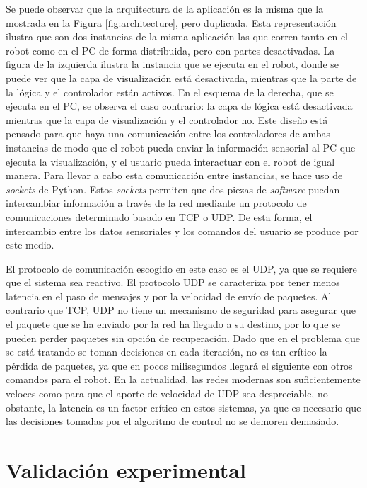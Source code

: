 Se puede observar que la arquitectura de la aplicación es la misma que la mostrada en la Figura \ref{fig:architecture}, pero duplicada. Esta representación ilustra que son dos instancias de la misma aplicación las que corren tanto en el robot como en el PC de forma distribuida, pero con partes desactivadas. La figura de la izquierda ilustra la instancia que se ejecuta en el robot, donde se puede ver que la capa de visualización está desactivada, mientras que la parte de la lógica y el controlador están activos. En el esquema de la derecha, que se ejecuta en el PC, se observa el caso contrario: la capa de lógica está desactivada mientras que la capa de visualización y el controlador no. Este diseño está pensado para que haya una comunicación entre los controladores de ambas instancias de modo que el robot pueda enviar la información sensorial al PC que ejecuta la visualización, y el usuario pueda interactuar con el robot de igual manera. Para llevar a cabo esta comunicación entre instancias, se hace uso de \textit{sockets} de Python. Estos \textit{sockets} permiten que dos piezas de \textit{software} puedan intercambiar información a través de la red mediante un protocolo de comunicaciones determinado basado en TCP o UDP. De esta forma, el intercambio entre los datos sensoriales y los comandos del usuario se produce por este medio.

El protocolo de comunicación escogido en este caso es el UDP, ya que se requiere que el sistema sea reactivo. El protocolo UDP se caracteriza por tener menos latencia en el paso de mensajes y por la velocidad de envío de paquetes. Al contrario que TCP, UDP no tiene un mecanismo de seguridad para asegurar que el paquete que se ha enviado por la red ha llegado a su destino, por lo que se pueden perder paquetes sin opción de recuperación. Dado que en el problema que se está tratando se toman decisiones en cada iteración, no es tan crítico la pérdida de paquetes, ya que en pocos milisegundos llegará el siguiente con otros comandos para el robot. En la actualidad, las redes modernas son suficientemente veloces como para que el aporte de velocidad de UDP sea despreciable, no obstante, la latencia es un factor crítico en estos sistemas, ya que es necesario que las decisiones tomadas por el algoritmo de control no se demoren demasiado.

\section{Validación experimental}

